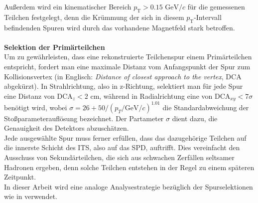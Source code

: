 \documentclass[12pt,a4paper]{report}
\begin{document}
Außerdem wird ein kinematischer Bereich $p_{\mathrm{T}} > 0.15$  $\mathrm{GeV}/c$ für die gemessenen Teilchen festgelegt, denn die Krümmung der sich in diesem $p_{\mathrm{T}}$-Intervall befindenden Spuren wird durch das vorhandene Magnetfeld stark betroffen. \\\\
\textbf{Selektion der Primärteilchen}\\
\hspace{-1em} Um zu gewährleisten, dass eine rekonstruierte Teilchenspur einem Primärteilchen entspricht, fordert man eine maximale Distanz vom Anfangspunkt der Spur zum Kollisionsvertex (in Englisch: \textit{Distance of closest approach to the vertex}, DCA abgekürzt). In Strahlrichtung, also in z-Richtung, selektiert man für jede Spur eine Distanz von $\mathrm{DCA}_{z} < 2$ cm, während in Radialrichtung eine von $\mathrm{DCA}_{xy} < 7\sigma$ benötigt wird, wobei $\sigma = 26 + 50/(p_{T}/\mathrm{GeV}/c)^{1.01}$ die Standardabweichung der Stoßparameterauflösung bezeichnet. Der Partameter $\sigma$ dient dazu, die Genauigkeit des Detektors abzuschätzen.\\
Jede ausgewählte Spur muss ferner erfüllen, dass das dazugehörige Teilchen auf die innerste Schicht des ITS, also auf das SPD, auftrifft. Dies vereinfacht den Ausschuss von Sekundärteilchen, die sich aus schwachen Zerfällen seltsamer Hadronen ergeben, denn solche Teilchen entstehen in der Regel zu einem späteren Zeitpunkt.\\
In dieser Arbeit wird eine analoge Analysestrategie bezüglich der Spurselektionen wie in \cite{eperezlezama2018} verwendet.
\end{document}
